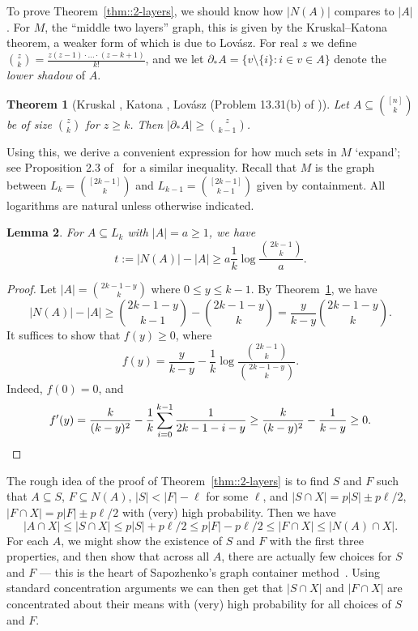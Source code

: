 \documentclass[12pt]{article}
\newtheorem{theorem}{Theorem}
\newtheorem{lemma}[theorem]{Lemma}
\begin{document}
To prove Theorem~\ref{thm::2-layers}, we should know how $|N(A)|$ compares to $|A|$. For $M$, the ``middle two layers'' graph, this is given by the Kruskal--Katona theorem, a weaker form of which is due to Lov\'asz. For real $z$ we define $\binom{z}{k} = \frac{z (z-1) \cdot \ldots \cdot (z-k+1)}{k!}$, and we let $\partial_* A = \{v \setminus \{i\} : i \in v \in A\}$ denote the \emph{lower shadow} of $A$.
\begin{theorem}[Kruskal \cite{Kruskal}, Katona \cite{Katona}, Lov\'asz (Problem 13.31(b) of \cite{Lovasz})]\label{thm::KK}
Let $A \subseteq \binom{[n]}{k}$ be of size $\binom{z}{k}$ for $z \geq k$. Then $|\partial_* A| \geq \binom{z}{k-1}$.
\end{theorem}
Using this, we derive a convenient expression for how much sets in $M$ `expand'; see Proposition 2.3 of~\cite{HK2} for a similar inequality. Recall that $M$ is the graph between $L_k = \binom{[2k-1]}{k}$ and $L_{k-1} = \binom{[2k-1]}{k-1}$ given by containment. All logarithms are natural unless otherwise indicated.
\begin{lemma}\label{lem::iso}
For $A \subseteq L_k$ with $|A| = a \geq 1$, we have
\[ t := |N(A)| - |A| \geq a \frac{1}{k} \log \frac{\binom{2k-1}{k}}{a} .\]
\end{lemma}
\begin{proof}
Let $|A| = \binom{2k-1-y}{k}$ where $0 \leq y \leq k-1$. By Theorem~\ref{thm::KK}, we have
\[ |N(A)| - |A| \geq \binom{2k-1-y}{k-1} - \binom{2k-1-y}{k} = \frac{y}{k-y} \binom{2k-1-y}{k} .\]
It suffices to show that $f(y) \geq 0$, where
\[ f(y) = \frac{y}{k-y} - \frac{1}{k} \log \frac{\binom{2k-1}{k}}{\binom{2k-1-y}{k}} .\]
Indeed, $f(0) = 0$, and
\[ f'(y) = \frac{k}{(k-y)^2} - \frac{1}{k} \sum_{i=0}^{k-1} \frac{1}{2k-1-i-y} \geq \frac{k}{(k-y)^2} - \frac{1}{k-y} \geq 0 .\qedhere\]
\end{proof}

The rough idea of the proof of Theorem~\ref{thm::2-layers} is to find $S$ and $F$ such that $A \subseteq S$, $F \subseteq N(A)$, $|S| < |F| - \ell$ for some $\ell$, and $|S \cap X| = p|S| \pm p\ell/2$, $|F \cap X| = p|F| \pm p\ell/2$ with (very) high probability. Then we have
\[ |A \cap X| \leq |S \cap X| \leq p|S| + p\ell/2 \leq p|F| - p\ell/2 \leq |F \cap X| \leq |N(A) \cap X| .\]
For each $A$, we might show the existence of $S$ and $F$ with the first three properties, and then show that across all $A$, there are actually few choices for $S$ and $F$ --- this is the heart of Sapozhenko's graph container method~\cite{Sap}. Using standard concentration arguments we can then get that $|S \cap X|$ and $|F \cap X|$ are concentrated about their means with (very) high probability for all choices of $S$ and $F$.
\end{document}
